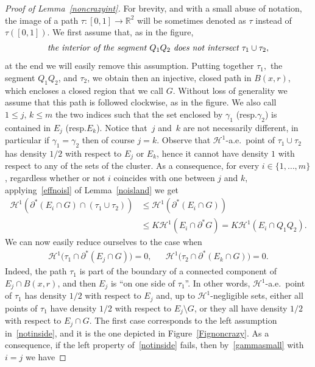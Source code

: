 \documentclass[11pt]{article}
\newcommand{\resp}{resp.\xspace}
\numberwithin{equation}{section}
\newcommand\R{\mathbb{R}}
\renewcommand\H{\mathcal{H}}
\theoremstyle{plain}
\theoremstyle{definition}
\begin{document}
\begin{proof}[Proof of Lemma~\ref{noncrazyint}]
For brevity, and with a small abuse of notation, the image of a path $\tau:[0,1]\to\R^2$ will be sometimes denoted as $\tau$ instead of $\tau([0,1])$. We first assume that, as in the figure,
\begin{equation}\label{justforasec}
\hbox{\it the interior of the segment $Q_1Q_2$ does not intersect $\tau_1\cup \tau_2$},
\end{equation}
at the end we will easily remove this assumption. Putting together $\tau_1,$ the segment $Q_1Q_2$, and $\tau_2$, we obtain then an injective, closed path in $B(x,r)$, which encloses a closed region that we call $G$. Without loss of generality we assume that this path is followed clockwise, as in the figure. We also call $1\leq j,\,k\leq m$ the two indices such that the set enclosed by $\gamma_1$ (\resp $\gamma_2$) is contained in $E_j$ (\resp $E_k$). Notice that~$j$ and~$k$ are not necessarily different, in particular if $\gamma_1=\gamma_2$ then of course $j=k$. Observe that $\H^1$-a.e.\ point of $\tau_1\cup\tau_2$ has density $1/2$ with respect to $E_j$ or $E_k$, hence it cannot have density $1$ with respect to any of the sets of the cluster. As a consequence, for every $i\in\{1,\dots,m\}$, regardless whether or not $i$ coincides with one between $j$ and $k$, applying~\eqref{effnoisl} of Lemma~\ref{noisland} we get
\begin{equation}\label{gammasmall}
\begin{split}
\H^1(\partial^* (E_i\cap G)\cap (\tau_1\cup\tau_2)) &\leq \H^1(\partial^*(E_i\cap G))\\
& \leq K \H^1(E_i\cap \partial^* G)=K \H^1(E_i\cap Q_1Q_2).
\end{split}
\end{equation}
We can now easily reduce ourselves to the case when
\begin{align}\label{notinside}
\H^1\big(\tau_1 \cap \partial^*(E_j\cap G)\big)=0, && \H^1\big(\tau_2 \cap \partial^*(E_k\cap G)\big)=0.
\end{align}
Indeed, the path $\tau_1$ is part of the boundary of a connected component of $E_j\cap B(x,r)$, and then $E_j$ is ``on one side of $\tau_1$''. In other words, $\H^1$-a.e.\ point of $\tau_1$ has density $1/2$ with respect to $E_j$ and, up to $\H^1$-negligible sets, either all points of $\tau_1$ have density $1/2$ with respect to $E_j\setminus G$, or they all have density $1/2$ with respect to $E_j\cap G$. The first case corresponds to the left assumption in~\eqref{notinside}, and it is the one depicted in Figure~\ref{Fignoncrazy}. As a consequence, if the left property of~\eqref{notinside} fails, then by~\eqref{gammasmall} with $i=j$ we have

\end{proof}
\end{document}
